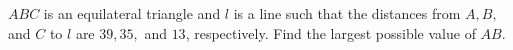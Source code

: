 $ABC$ is an equilateral triangle and $l$ is a line such that the distances from $A, B,$ and $C$ to $l$ are $39, 35,$ and $13$, respectively. Find the largest possible value of $AB$.




